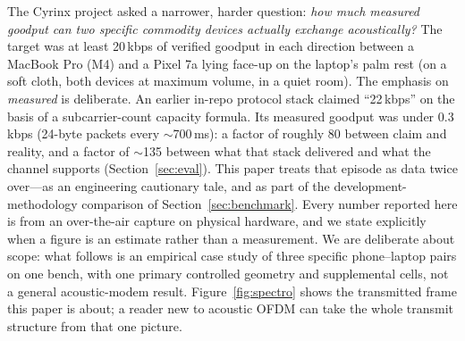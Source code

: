 \documentclass[11pt]{article}
\begin{document}
The Cyrinx project asked a narrower, harder question: \emph{how much measured
goodput can two specific commodity devices actually exchange acoustically?}
The target was at least 20\,kbps of verified goodput in each direction between
a MacBook Pro (M4) and a Pixel 7a lying face-up on the laptop's palm rest (on
a soft cloth, both devices at maximum volume, in a quiet room).
The emphasis on \emph{measured} is deliberate. An earlier in-repo protocol
stack claimed ``22\,kbps'' on the basis of a subcarrier-count capacity
formula. Its measured goodput was under 0.3\,kbps (24-byte packets every
$\sim$700\,ms): a factor of roughly 80 between claim and reality, and a
factor of $\sim$135 between what that stack delivered and what the channel
supports (Section~\ref{sec:eval}). This paper treats that episode as data
twice over---as an engineering cautionary tale, and as part of the
development-methodology comparison of Section~\ref{sec:benchmark}. Every
number reported here is from an over-the-air capture on physical hardware,
and we state explicitly when a figure is an estimate rather than a
measurement. We are deliberate about scope: what follows is an empirical
case study of three specific phone--laptop pairs on one bench, with one primary
controlled geometry and supplemental cells, not a general
acoustic-modem result. Figure~\ref{fig:spectro} shows the transmitted frame
this paper is about; a reader new to acoustic OFDM can take the whole
transmit structure from that one picture.
\end{document}
